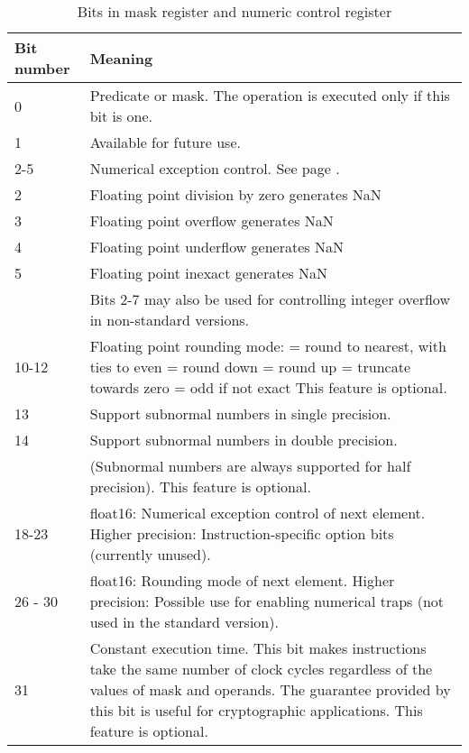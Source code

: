 \documentclass[forwardcom.tex]{subfiles}
\begin{document}
\begin{longtable}
{|p{15mm}|p{90mm}|}
\caption{Bits in mask register and numeric control register}
\label{table:maskBits}
\endfirsthead
\endhead
\hline
\bfseries Bit number & \bfseries Meaning \\
 \hline
0 & Predicate or mask. The operation is executed only if this bit is one.\\
1 & Available for future use. \\
\hline
2-5 & Numerical exception control. See page \pageref{table:FPExceptionTypes}. \\
2 & Floating point division by zero generates NaN \\
3 & Floating point overflow generates NaN \\
4 & Floating point underflow generates NaN \\
5 & Floating point inexact generates NaN \\
  & Bits 2-7 may also be used for controlling integer overflow in non-standard versions.\\ \hline
10-12 & Floating point rounding mode: \newline
000 = round to nearest, with ties to even \newline
001 = round down \newline
010 = round up \newline
011 = truncate towards zero \newline
100 = odd if not exact \newline
This feature is optional.\\ \hline
13 & Support subnormal numbers in single precision. \\
14 & Support subnormal numbers in double precision. \\
 &  (Subnormal numbers are always supported for half precision). This feature is optional.\\ \hline  
18-23 & float16: Numerical exception control of next element. \newline
        Higher precision: Instruction-specific option bits (currently unused). \\
\hline
26 - 30 & float16: Rounding mode of next element. \newline
        Higher precision: Possible use for enabling numerical traps (not used in the standard version). \\
\hline
31 & Constant execution time. This bit makes instructions take the same number of clock cycles regardless of the values of mask and operands. The guarantee provided by this bit is useful for cryptographic applications. This feature is optional. \\
\hline
\end{longtable}
\end{document}
